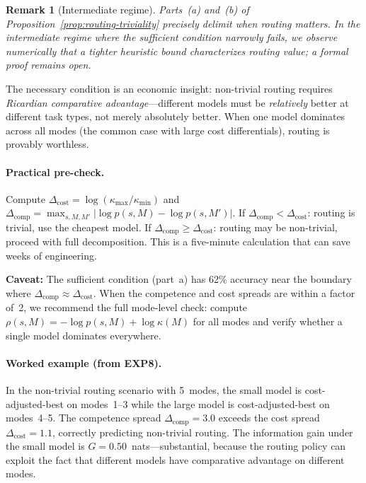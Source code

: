 \documentclass[twoside,11pt]{article}
\newtheorem{remark}{Remark}
\begin{document}
\begin{remark}[Intermediate regime]
\label{rem:intermediate-routing}
Parts~(a) and~(b) of Proposition~\ref{prop:routing-triviality} precisely delimit when routing matters.
In the intermediate regime where the sufficient condition narrowly fails, we observe numerically that a tighter heuristic bound characterizes routing value; a formal proof remains open.
\end{remark}

The necessary condition is an economic insight: non-trivial routing requires \emph{Ricardian comparative advantage}---different models must be \emph{relatively} better at different task types, not merely absolutely better.
When one model dominates across all modes (the common case with large cost differentials), routing is provably worthless.

\paragraph{Practical pre-check.}
Compute $\Delta_{\mathrm{cost}} = \log(\kappa_{\max}/\kappa_{\min})$ and $\Delta_{\mathrm{comp}} = \max_{s,M,M'} |\log p(s,M) - \log p(s,M')|$.
If $\Delta_{\mathrm{comp}} < \Delta_{\mathrm{cost}}$: routing is trivial, use the cheapest model.
If $\Delta_{\mathrm{comp}} \ge \Delta_{\mathrm{cost}}$: routing may be non-trivial, proceed with full decomposition.
This is a five-minute calculation that can save weeks of engineering.

\textbf{Caveat:} The sufficient condition (part~a) has 62\% accuracy near the boundary where $\Delta_{\mathrm{comp}} \approx \Delta_{\mathrm{cost}}$.
When the competence and cost spreads are within a factor of~2, we recommend the full mode-level check: compute $\rho(s,M) = -\log p(s,M) + \log\kappa(M)$ for all modes and verify whether a single model dominates everywhere.

\paragraph{Worked example (from EXP8).}
In the non-trivial routing scenario with 5~modes, the small model is cost-adjusted-best on modes~1--3 while the large model is cost-adjusted-best on modes~4--5.
The competence spread $\Delta_{\mathrm{comp}} = 3.0$ exceeds the cost spread $\Delta_{\mathrm{cost}} = 1.1$, correctly predicting non-trivial routing.
The information gain under the small model is $G = 0.50$~nats---substantial, because the routing policy can exploit the fact that different models have comparative advantage on different modes.
\end{document}
